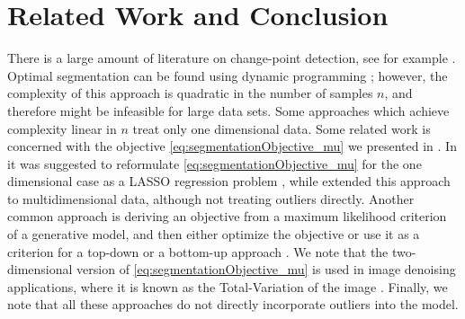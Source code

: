 \section{Related Work and Conclusion}\label{sec:conclusion}
There is a large amount of literature on change-point detection, see for example \cite{basseville1993detection,brodsky1993nonparametric}.
Optimal segmentation can be found using dynamic programming \cite{lavielle2006changepoint}; however, the complexity of this approach is quadratic in the number of samples $n$, and therefore might be infeasible for large data sets. Some approaches which achieve complexity linear in $n$ \cite{levy2007catching,killick2012optimal} treat only one dimensional data. %
Some related work is concerned with the objective \eqref{eq:segmentationObjective_mu} we presented in . In \cite{levy2007catching} it was suggested to reformulate \eqref{eq:segmentationObjective_mu} for the one dimensional case as a LASSO regression problem \cite{tibshirani1996regression,yuan2006model}, while %
\cite{bleakley2011group}
extended this approach to multidimensional data, although not treating outliers directly.
Another common approach is deriving an objective from a maximum likelihood criterion of a generative model, and then either optimize the objective or use it as a criterion for a top-down or a bottom-up approach \cite{qiao:2012study,phonemeSeg:2008,gracia:2011hierarchical,olshen2004circular}. We note that the two-dimensional version of \eqref{eq:segmentationObjective_mu} is used in image denoising applications, where it is known as the Total-Variation of the image \cite{Rudin:1992,Chambolle:2004,Beck_TV:2009}.
Finally, we note that all these approaches do not directly incorporate outliers into the model.

